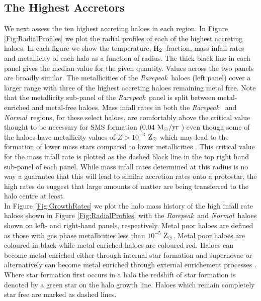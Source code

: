 \documentclass[graphics, twocolumn, usenatbib]{mn2e}
\newcommand{\msolaryr} {$\rm{M_{\odot}/yr}~$}
\newcommand{\zsolar} {$\rm{Z_{\odot}}~$}
\newcommand{\zsolarc} {$\rm{Z_{\odot}}$}
\newcommand{\molH} {$\rm{H_2}$~}
\newcommand{\rarepeak} {\textit{Rarepeak~}}
\newcommand{\normal} {\textit{Normal~}}
\begin{document}
\subsection{The Highest Accretors}
\indent We next assess the ten highest accreting haloes in each region. In Figure
\ref{Fig:RadialProfiles} we plot the radial profiles of each of the highest accreting haloes.
In each figure we show the temperature, \molH fraction, mass infall rates and
metallicity of each halo as a function of radius. The thick black line in each panel gives the
median value for the given quantity. Values across the two panels are broadly similar. The
metallicities of the \rarepeak haloes (left panel) cover a larger range with three of the highest
accreting haloes remaining metal free. Note that the metallicity sub-panel of the \rarepeak panel
is split between metal-enriched and metal-free haloes. Mass infall rates in both the \rarepeak
and \normal regions, for these select haloes, are comfortably above the critical value thought to
be necessary for SMS formation (0.04
\msolaryr \citep{Sakurai_2016}) even though some of the haloes have metallicity values of $Z > 10^{-3}$
\zsolar which may lead to the formation of lower mass stars compared to lower metallicities
\citep{Chon_2020}. This critical value for the mass infall rate is plotted as the dashed black line in
the top right hand sub-panel of each panel. While mass infall rates determined at this radius is no
way a guarantee that this will lead to similar accretion rates onto a protostar, the high rates do
suggest that large amounts of matter are being transferred to the halo centre at least. \\
\indent In Figure \ref{Fig:GrowthRates} we plot the halo mass history of the high infall
rate haloes shown in Figure \ref{Fig:RadialProfiles} with the \rarepeak and \normal haloes
shown on left- and right-hand panels, respectively. 
Metal poor haloes are defined as those with gas phase metallicities less than
$10^{-5}$ \zsolarc. Metal poor haloes are coloured in black while metal enriched haloes are coloured
red. Haloes can become metal enriched either through internal star formation and supernovae or
alternatively can become metal enriched through external enrichement processes
\citep[e.g.][]{Smith_2015}. Where star formation first
occurs in a halo the redshift of star formation is denoted by a green star on the halo growth line. 
Haloes which remain completely star free are marked as dashed lines. \\
\end{document}
